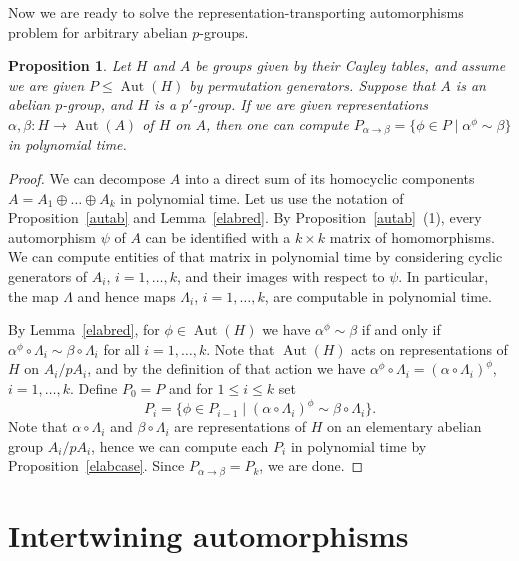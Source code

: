 \documentclass{article}
\newtheorem{proposition}[theorem]{Proposition}
\DeclareMathOperator{\Aut}{Aut}
\begin{document}
Now we are ready to solve the representation-transporting automorphisms problem for arbitrary abelian \( p \)-groups.

\begin{proposition}\label{ptop}
	Let \( H \) and \( A \) be groups given by their Cayley tables, and assume we are given \( P \leq \Aut(H) \) 
	by permutation generators. Suppose that \( A \) is an abelian \( p \)-group, and \( H \) is a \( p' \)-group.
	If we are given representations \( \alpha, \beta : H \to \Aut(A) \) of \( H \) on \( A \), then one can compute
	\( P_{\alpha \to \beta} = \{ \phi \in P \mid \alpha^\phi \sim \beta \} \) in polynomial time.
\end{proposition}
\begin{proof}
	We can decompose \( A \) into a direct sum of its homocyclic components \( A = A_1 \oplus \dots \oplus A_k \)
	in polynomial time. Let us use the notation of Proposition~\ref{autab} and Lemma~\ref{elabred}.
	By Proposition~\ref{autab}~(1), every automorphism \( \psi \) of \( A \) can be identified with a \( k \times k \) matrix
	of homomorphisms. We can compute entities of that matrix in polynomial time by considering cyclic generators of \( A_i \), \( i = 1, \dots, k \),
	and their images with respect to \( \psi \). In particular, the map \( \Lambda \) and hence maps \( \Lambda_i \), \( i = 1, \dots, k \),
	are computable in polynomial time.

	By Lemma~\ref{elabred}, for \( \phi \in \Aut(H) \) we have \( \alpha^\phi \sim \beta \) if and only if \( \alpha^\phi \circ \Lambda_i \sim \beta \circ \Lambda_i \)
	for all \( i = 1, \dots, k \). Note that \( \Aut(H) \) acts on representations of \( H \) on \( A_i/pA_i \),
	and by the definition of that action we have \( \alpha^\phi \circ \Lambda_i = (\alpha \circ \Lambda_i)^\phi \), \( i = 1, \dots, k \).
	Define \( P_0 = P \) and for \( 1 \leq i \leq k \) set
	\[ P_i = \{ \phi \in P_{i-1} \mid (\alpha \circ \Lambda_i)^\phi \sim \beta \circ \Lambda_i \}. \]
	Note that \( \alpha \circ \Lambda_i \) and \( \beta \circ \Lambda_i \) are representations of \( H \) on an elementary abelian group \( A_i/pA_i \),
	hence we can compute each \( P_i \) in polynomial time by Proposition~\ref{elabcase}. Since \( P_{\alpha \to \beta} = P_k \), we are done.
\end{proof}

\section{Intertwining automorphisms}\label{secInta}
\end{document}
